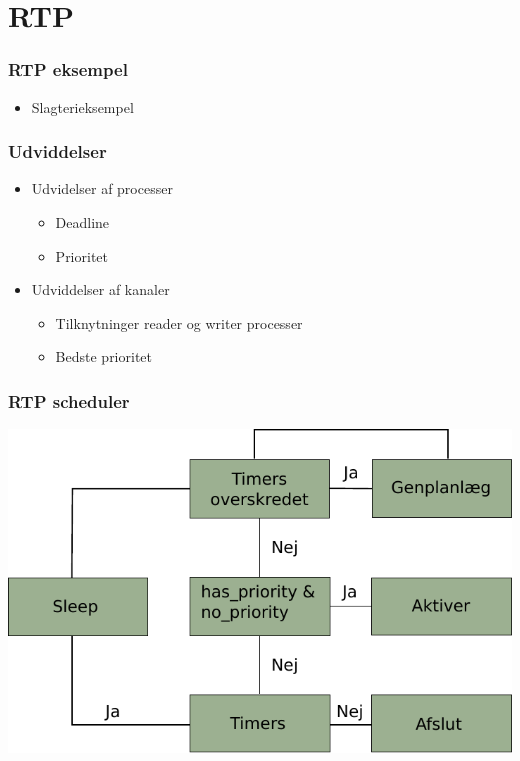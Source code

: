 \documentclass[12pt]{beamer}
\begin{document}
\section{RTP}
\begin{frame}
  \frametitle{RTP eksempel}
  \begin{itemize}   
    \item Slagterieksempel
  \end{itemize}
\end{frame}


\begin{frame}
  \frametitle{Udviddelser}
  \begin{itemize}
	\item Udvidelser af processer   
	  \begin{itemize}   
		\item Deadline
		\item Prioritet	
	  \end{itemize}
	\item Udviddelser af kanaler
	  \begin{itemize}   
		\item Tilknytninger reader og writer processer
		\item Bedste prioritet
	  \end{itemize}
\end{itemize}
\end{frame}


\begin{frame}
  \frametitle{RTP scheduler}
\includegraphics[scale=0.9]{rtp-scheduler} 
\end{frame}
\end{document}
